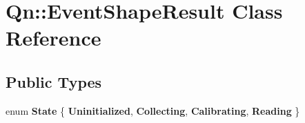 \hypertarget{classQn_1_1EventShapeResult}{}\section{Qn\+:\+:Event\+Shape\+Result Class Reference}
\label{classQn_1_1EventShapeResult}
\subsection*{Public Types}
\begin{DoxyCompactItemize}
\item 
\mbox{\label{classQn_1_1EventShapeResult_a21d00afbd3a0896249f23b20e6c365a0}} 
enum {\bfseries State} \{ {\bfseries Uninitialized}, 
{\bfseries Collecting}, 
{\bfseries Calibrating}, 
{\bfseries Reading}
 \}
\end{DoxyCompactItemize}
